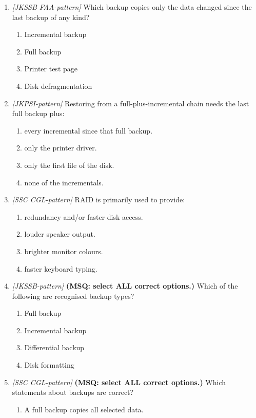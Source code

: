 \begin{enumerate}[label=\textbf{Q\arabic*.}, leftmargin=*]
\item \textit{[JKSSB FAA-pattern]} Which backup copies only the data changed since the last backup of any kind?
  \begin{enumerate}[label=\Alph*.]
    \item Incremental backup
    \item Full backup
    \item Printer test page
    \item Disk defragmentation
  \end{enumerate}
\item \textit{[JKPSI-pattern]} Restoring from a full-plus-incremental chain needs the last full backup plus:
  \begin{enumerate}[label=\Alph*.]
    \item every incremental since that full backup.
    \item only the printer driver.
    \item only the first file of the disk.
    \item none of the incrementals.
  \end{enumerate}
\item \textit{[SSC CGL-pattern]} RAID is primarily used to provide:
  \begin{enumerate}[label=\Alph*.]
    \item redundancy and/or faster disk access.
    \item louder speaker output.
    \item brighter monitor colours.
    \item faster keyboard typing.
  \end{enumerate}
\item \textit{[JKSSB-pattern]} \textbf{(MSQ: select ALL correct options.)} Which of the following are recognised backup types?
  \begin{enumerate}[label=\Alph*.]
    \item Full backup
    \item Incremental backup
    \item Differential backup
    \item Disk formatting
  \end{enumerate}
\item \textit{[SSC CGL-pattern]} \textbf{(MSQ: select ALL correct options.)} Which statements about backups are correct?
  \begin{enumerate}[label=\Alph*.]
    \item A full backup copies all selected data.

\end{enumerate}
\end{enumerate}
